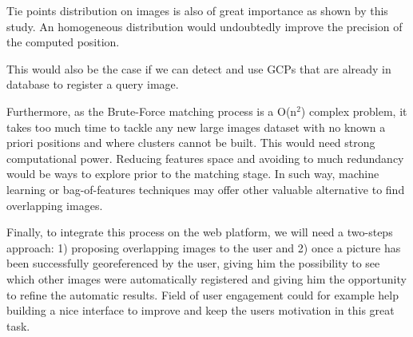 \documentclass[fleqn,10pt]{wlpeerj} %
\begin{document}
Tie points distribution on images is also of great importance as shown by this
study. An homogeneous distribution would undoubtedly improve the precision of the
computed position.

This would also be the case if we can detect and use GCPs that are already 
in database to register a query image. 

Furthermore, as the Brute-Force matching process is a O(n$^{2}$) complex problem, 
it takes too much time to tackle any new large images dataset with no known 
a priori positions and where clusters cannot be built. This would need strong
computational power.
Reducing features space and avoiding to much redundancy would be ways to explore 
prior to the matching stage.
In such way, machine learning or bag-of-features techniques may offer other 
valuable alternative to find overlapping images.


Finally, to integrate this process on the web platform, we will need a two-steps
approach: 1) proposing overlapping images to the user and 2) once a picture has 
been successfully georeferenced by the user, giving him the possibility to see
which other images were automatically registered and giving him the opportunity
to refine the automatic results. Field of user engagement could for example 
help building a nice interface to improve and keep the users motivation in this 
great task.








\end{document}
